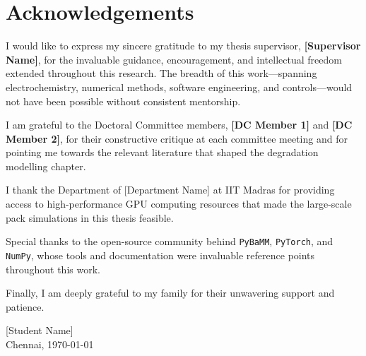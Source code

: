 \chapter*{Acknowledgements}
\thispagestyle{plain}

I would like to express my sincere gratitude to my thesis supervisor, \textbf{[Supervisor Name]}, for the invaluable guidance, encouragement, and intellectual freedom extended throughout this research. The breadth of this work---spanning electrochemistry, numerical methods, software engineering, and controls---would not have been possible without consistent mentorship.

I am grateful to the Doctoral Committee members, \textbf{[DC Member 1]} and \textbf{[DC Member 2]}, for their constructive critique at each committee meeting and for pointing me towards the relevant literature that shaped the degradation modelling chapter.

I thank the Department of [Department Name] at IIT Madras for providing access to high-performance GPU computing resources that made the large-scale pack simulations in this thesis feasible.

Special thanks to the open-source community behind \texttt{PyBaMM}, \texttt{PyTorch}, and \texttt{NumPy}, whose tools and documentation were invaluable reference points throughout this work.

Finally, I am deeply grateful to my family for their unwavering support and patience.

\vspace{1cm}
\hfill [Student Name]\\
\hfill Chennai, \today

\newpage
